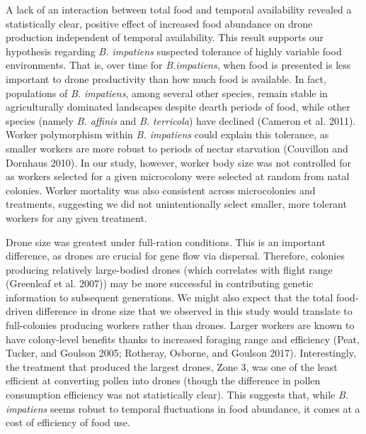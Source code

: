\documentclass[11pt,]{article}
\begin{document}
A lack of an interaction between total food and temporal availability
revealed a statistically clear, positive effect of increased food
abundance on drone production independent of temporal availability. This
result supports our hypothesis regarding \emph{B. impatiens} suspected
tolerance of highly variable food environments. That is, over time for
\emph{B.impatiens}, when food is presented is less important to drone
productivity than how much food is available. In fact, populations of
\emph{B. impatiens}, among several other species, remain stable in
agriculturally dominated landscapes despite dearth periods of food,
while other species (namely \emph{B. affinis} and \emph{B. terricola})
have declined (Cameron et al. 2011). Worker polymorphism within \emph{B.
impatiens} could explain this tolerance, as smaller workers are more
robust to periods of nectar starvation (Couvillon and Dornhaus 2010). In
our study, however, worker body size was not controlled for as workers
selected for a given microcolony were selected at random from natal
colonies. Worker mortality was also consistent across microcolonies and
treatments, suggesting we did not unintentionally select smaller, more
tolerant workers for any given treatment.

Drone size was greatest under full-ration conditions. This is an
important difference, as drones are crucial for gene flow via dispersal.
Therefore, colonies producing relatively large-bodied drones (which
correlates with flight range (Greenleaf et al. 2007)) may be more
successful in contributing genetic information to subsequent
generations. We might also expect that the total food-driven difference
in drone size that we observed in this study would translate to
full-colonies producing workers rather than drones. Larger workers are
known to have colony-level benefits thanks to increased foraging range
and efficiency (Peat, Tucker, and Goulson 2005; Rotheray, Osborne, and
Goulson 2017). Interestingly, the treatment that produced the largest
drones, Zone 3, was one of the least efficient at converting pollen into
drones (though the difference in pollen consumption efficiency was not
statistically clear). This suggests that, while \emph{B. impatiens}
seems robust to temporal fluctuations in food abundance, it comes at a
cost of efficiency of food use.
\end{document}
